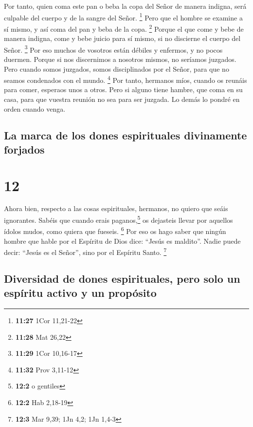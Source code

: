  Por tanto, quien coma este pan o beba la copa del Señor
de manera indigna, será culpable del cuerpo y de la sangre del Señor.
\footnote{\textbf{11:27} 1Cor 11,21-22}  Pero que el
hombre se examine a sí mismo, y así coma del pan y beba de la copa.
\footnote{\textbf{11:28} Mat 26,22}  Porque el que come y
bebe de manera indigna, come y bebe juicio para sí mismo, si no
discierne el cuerpo del Señor. \footnote{\textbf{11:29} 1Cor 10,16-17}
 Por eso muchos de vosotros están débiles y enfermos, y
no pocos duermen.  Porque si nos discernimos a nosotros
mismos, no seríamos juzgados.  Pero cuando somos
juzgados, somos disciplinados por el Señor, para que no seamos
condenados con el mundo. \footnote{\textbf{11:32} Prov 3,11-12}
 Por tanto, hermanos míos, cuando os reunáis para comer,
esperaos unos a otros.  Pero si alguno tiene hambre, que
coma en su casa, para que vuestra reunión no sea para ser juzgada. Lo
demás lo pondré en orden cuando venga.

\hypertarget{la-marca-de-los-dones-espirituales-divinamente-forjados}{%
\subsection{La marca de los dones espirituales divinamente
forjados}\label{la-marca-de-los-dones-espirituales-divinamente-forjados}}

\hypertarget{section-11}{%
\section{12}\label{section-11}}

 Ahora bien, respecto a las cosas espirituales, hermanos,
no quiero que seáis ignorantes.  Sabéis que cuando erais
paganos,\footnote{\textbf{12:2} o gentiles} os dejasteis llevar por
aquellos ídolos mudos, como quiera que fueseis. \footnote{\textbf{12:2}
  Hab 2,18-19}  Por eso os hago saber que ningún hombre
que hable por el Espíritu de Dios dice: ``Jesús es maldito''. Nadie
puede decir: ``Jesús es el Señor'', sino por el Espíritu Santo.
\footnote{\textbf{12:3} Mar 9,39; 1Jn 4,2; 1Jn 1,4-3}

\hypertarget{diversidad-de-dones-espirituales-pero-solo-un-espuxedritu-activo-y-un-propuxf3sito}{%
\subsection{Diversidad de dones espirituales, pero solo un espíritu
activo y un
propósito}\label{diversidad-de-dones-espirituales-pero-solo-un-espuxedritu-activo-y-un-propuxf3sito}}

